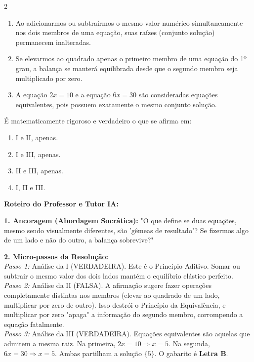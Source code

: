 \begin{multicols*}{2}
\begin{enunciadoLiteral}
\begin{enumerate}[label=\Roman*., itemsep=\espacoAlt]
\item Ao adicionarmos ou subtrairmos o mesmo valor numérico simultaneamente nos dois membros de uma equação, suas raízes (conjunto solução) permanecem inalteradas.
\item Se elevarmos ao quadrado apenas o primeiro membro de uma equação do 1º grau, a balança se manterá equilibrada desde que o segundo membro seja multiplicado por zero.
\item A equação $2x = 10$ e a equação $6x = 30$ são consideradas equações equivalentes, pois possuem exatamente o mesmo conjunto solução.
\end{enumerate}

É matematicamente rigoroso e verdadeiro o que se afirma em:

\begin{enumerate}[label=\alph*), itemsep=\espacoAlt]
\item I e II, apenas.
\item I e III, apenas.
\item II e III, apenas.
\item I, II e III.
\end{enumerate}
\end{enunciadoLiteral}

\ifgabarito
    \begin{tcolorbox}[colback=CorTitUm!5, colframe=CorTitUm, boxrule=1pt, arc=4pt, left=6pt, right=6pt, top=6pt, bottom=6pt]
    \small\textbf{\textcolor{CorTitUm}{Roteiro do Professor e Tutor IA:}}\par\vspace{0.1cm}
    \color{CinzaEscuro}
    \textbf{1. Ancoragem (Abordagem Socrática):} "O que define se duas equações, mesmo sendo visualmente diferentes, são 'gêmeas de resultado'? Se fizermos algo de um lado e não do outro, a balança sobrevive?"\par\vspace{0.1cm}
    
    \textbf{2. Micro-passos da Resolução:}\\
    \textit{Passo 1:} Análise da I (VERDADEIRA). Este é o Princípio Aditivo. Somar ou subtrair o mesmo valor dos dois lados mantém o equilíbrio elástico perfeito.\\
    \textit{Passo 2:} Análise da II (FALSA). A afirmação sugere fazer operações completamente distintas nos membros (elevar ao quadrado de um lado, multiplicar por zero de outro). Isso destrói o Princípio da Equivalência, e multiplicar por zero "apaga" a informação do segundo membro, corrompendo a equação fatalmente.\\
    \textit{Passo 3:} Análise da III (VERDADEIRA). Equações equivalentes são aquelas que admitem a mesma raiz. Na primeira, $2x = 10 \Rightarrow x = 5$. Na segunda, $6x = 30 \Rightarrow x = 5$. Ambas partilham a solução $\{5\}$. O gabarito é \textbf{Letra B}.\par\vspace{0.1cm}
    

\end{tcolorbox}
\end{multicols*}
